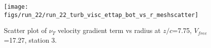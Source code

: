 \begin{figure}[H]
\centering
\texttt{[image: figs/run\_22/run\_22\_turb\_visc\_ettap\_bot\_vs\_r\_meshscatter]}
\caption{Scatter plot of $\nu_T$ velocity gradient term vs radius at $z/c$=7.75, $V_{free}$=17.27, station 3.}
\label{fig:run_22_turb_visc_ettap_bot_vs_r_meshscatter}
\end{figure}


